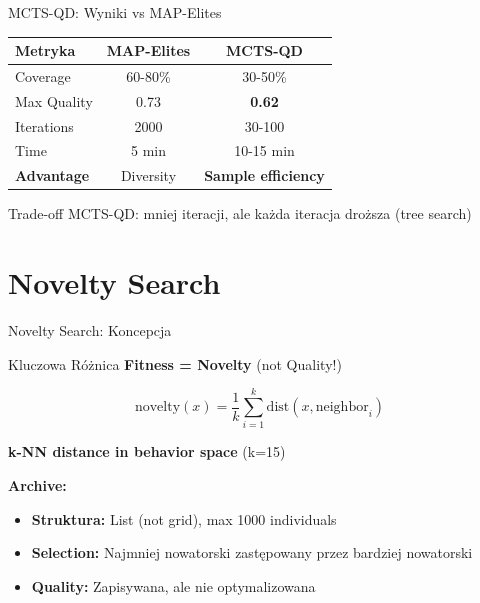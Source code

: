 \documentclass{beamer}
\begin{document}
\begin{frame}{MCTS-QD: Wyniki vs MAP-Elites}
\begin{table}
\centering
\begin{tabular}{lcc}
\toprule
\textbf{Metryka} & \textbf{MAP-Elites} & \textbf{MCTS-QD} \\
\midrule
Coverage & 60-80\% & 30-50\% \\
Max Quality & 0.73 & \textbf{0.62} \\
Iterations & 2000 & 30-100 \\
Time & 5 min & 10-15 min \\
\midrule
\textbf{Advantage} & Diversity & \textbf{Sample efficiency} \\
\bottomrule
\end{tabular}
\end{table}

\vspace{0.5cm}
\begin{block}{Trade-off}
MCTS-QD: mniej iteracji, ale każda iteracja droższa (tree search)
\end{block}
\end{frame}

\section{Novelty Search}

\begin{frame}{Novelty Search: Koncepcja}
\begin{alertblock}{Kluczowa Różnica}
\textbf{Fitness = Novelty} (not Quality!)
\end{alertblock}

\begin{equation}
\text{novelty}(x) = \frac{1}{k}\sum_{i=1}^{k} \text{dist}(x, \text{neighbor}_i)
\end{equation}

\textbf{k-NN distance in behavior space} (k=15)

\vspace{0.5cm}
\textbf{Archive:}
\begin{itemize}
\item \textbf{Struktura:} List (not grid), max 1000 individuals
\item \textbf{Selection:} Najmniej nowatorski zastępowany przez bardziej nowatorski
\item \textbf{Quality:} Zapisywana, ale nie optymalizowana
\end{itemize}
\end{frame}
\end{document}
